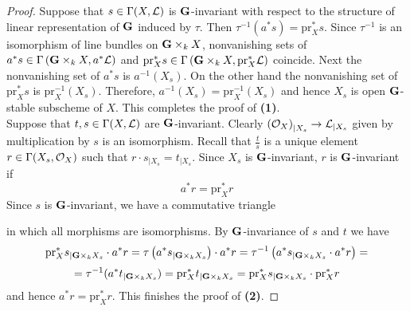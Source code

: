 \begin{proof}
Suppose that $s\in \Gamma(X,{\mathcal L})$ is $\mathbf{G}$-invariant with respect to the structure of linear representation of $\mathbf{G}$ induced by $\tau$. Then $\tau^{-1}(a^*s) = \mathrm{pr}_X^*s$. Since $\tau^{-1}$ is an isomorphism of line bundles on $\mathbf{G}\times_kX$, nonvanishing sets of $a^*s \in \Gamma\left(\mathbf{G}\times_kX,a^*{\mathcal L}\right)$ and $\mathrm{pr}_X^*s \in \Gamma\left(\mathbf{G}\times_kX,\mathrm{pr}_X^*{\mathcal L}\right)$ coincide. Next the nonvanishing set of $a^*s$ is $a^{-1}(X_s)$. On the other hand the nonvanishing set of $\mathrm{pr}_X^*s$ is $\mathrm{pr}_X^{-1}(X_s)$. Therefore, $a^{-1}(X_s) = \mathrm{pr}_X^{-1}(X_s)$ and hence $X_s$ is open $\mathbf{G}$-stable subscheme of $X$. This completes the proof of \textbf{(1)}.\\
Suppose that $t,s\in \Gamma(X,{\mathcal L})$ are $\mathbf{G}$-invariant. Clearly $\left({\mathcal O}_{X}\right)_{\mid X_s} \rightarrow {\mathcal L}_{\mid X_s}$ given by multiplication by $s$ is an isomorphism. Recall that $\frac{t}{s}$ is a unique element $r \in \Gamma(X_s,{\mathcal O}_X)$ such that $r\cdot s_{\mid X_s} = t_{\mid X_s}$. Since $X_s$ is $\mathbf{G}$-invariant, $r$ is $\mathbf{G}$-invariant if 
$$a^*r = \mathrm{pr}_X^*r$$
Since $s$ is $\mathbf{G}$-invariant, we have a commutative triangle
\begin{center}
\end{center}
in which all morphisms are isomorphisms. By $\mathbf{G}$-invariance of $s$ and $t$ we have
$$\mathrm{pr}_X^*s_{\mid \mathbf{G}\times_kX_s} \cdot a^*r = \tau\left(a^*s_{\mid \mathbf{G}\times_kX_s}\right)\cdot a^*r = \tau^{-1}\left(a^*s_{\mid \mathbf{G}\times_kX_s}\cdot a^*r\right) =$$
$$= \tau^{-1}(a^*t_{\mid \mathbf{G}\times_kX_s}) = \mathrm{pr}_X^*t_{\mid \mathbf{G}\times_kX_s} = \mathrm{pr}_X^*s_{\mid \mathbf{G}\times_kX_s}\cdot \mathrm{pr}_X^*r$$
and hence $a^*r = \mathrm{pr}_X^*r$. This finishes the proof of \textbf{(2)}.
\end{proof}

